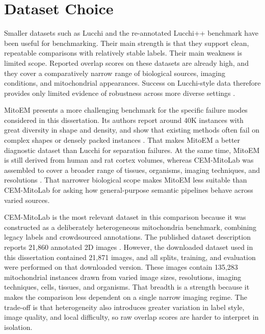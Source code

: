 \documentclass[logo,bsc,singlespacing,parskip,online]{infthesis}
\begin{document}
\section{Dataset Choice}

Smaller datasets such as Lucchi and the re-annotated Lucchi++ benchmark have
been useful for benchmarking. Their main strength is that they support clean,
repeatable comparisons with relatively stable labels. Their main weakness is
limited scope. Reported overlap scores on these datasets are already high, and
they cover a comparatively narrow range of biological sources, imaging
conditions, and mitochondrial appearances. Success on Lucchi-style data
therefore provides only limited evidence of robustness across more diverse
settings \citep{lucchi2012supervoxel, casser2020fast,
franco-barranco2022stable, conrad2023instance}.

MitoEM presents a more challenging benchmark for the specific failure modes 
considered in this dissertation. Its authors report
around 40K instances with great diversity in shape and density, and show that
existing methods often fail on complex shapes or densely packed
instances \citep{wei2020mitoem}. That makes MitoEM a better diagnostic dataset
than Lucchi for separation failures. At the same time, MitoEM is still derived
from human and rat cortex volumes, whereas CEM-MitoLab was assembled to cover a
broader range of tissues, organisms, imaging techniques, and resolutions
\citep{wei2020mitoem, conrad2023instance}. That narrower biological scope makes
MitoEM less suitable than CEM-MitoLab for asking how general-purpose semantic
pipelines behave across varied sources.

CEM-MitoLab is the most relevant dataset in this comparison because it was
constructed as a deliberately heterogeneous mitochondria benchmark, combining
legacy labels and crowdsourced annotations. The published dataset description
reports 21,860 annotated 2D images \citep{conrad2023instance}. However, the
downloaded dataset used in this dissertation contained 21,871 images, and all
splits, training, and evaluation were performed on that downloaded version. These images
contain 135,283 mitochondrial instances drawn from varied image sizes,
resolutions, imaging techniques, cells, tissues, and organisms. That breadth
is a strength because it makes the comparison less dependent on a single narrow
imaging regime. The trade-off is that heterogeneity also introduces greater
variation in label style, image quality, and local difficulty, so raw overlap
scores are harder to interpret in isolation.
\end{document}
